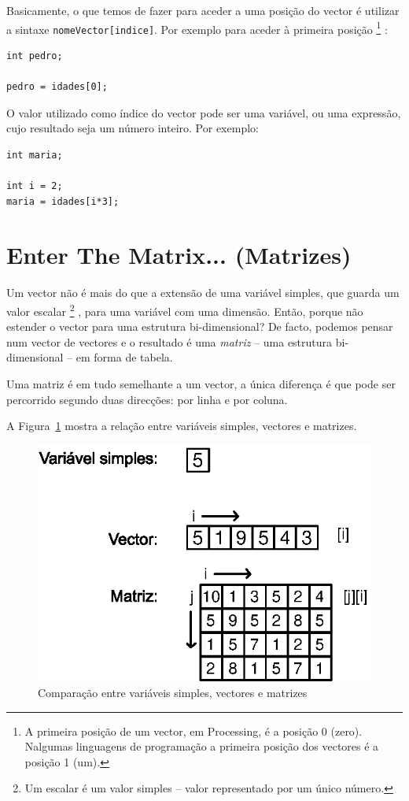 Basicamente, o que temos de fazer para aceder a uma posição do vector é utilizar a sintaxe \texttt{nomeVector[indice]}.
Por exemplo para aceder à primeira posição%
\footnote{A primeira posição de um vector, em Processing, é a posição 0 (zero). Nalgumas linguagens de programação a primeira posição dos vectores é a posição 1 (um).}%
:
\begin{lstlisting}
int pedro;

pedro = idades[0];
\end{lstlisting}

O valor utilizado como índice do vector pode ser uma variável, ou uma expressão, cujo resultado seja um número inteiro. Por exemplo:
\begin{lstlisting}
int maria;

int i = 2;
maria = idades[i*3];
\end{lstlisting}


\section{Enter The Matrix... (Matrizes)}
Um vector não é mais do que a extensão de uma variável simples, que guarda um valor escalar%
\footnote{Um escalar é um valor simples -- valor representado por um único número.}%
, para uma variável com uma dimensão. Então, porque não estender o vector para uma estrutura bi-dimensional?
De facto, podemos pensar num vector de vectores e o resultado é uma \emph{matriz} -- uma estrutura bi-dimensional -- em forma de tabela.

Uma matriz é em tudo semelhante a um vector, a única diferença é que pode ser percorrido segundo duas direcções: por linha e por coluna. 

A Figura~\ref{fig:variaveis} mostra a relação entre variáveis simples, vectores e matrizes.

\begin{figure}[htbp]
	\centering
		\includegraphics{images/variaveis.eps}
	\caption{Comparação entre variáveis simples, vectores e matrizes}
	\label{fig:variaveis}
\end{figure}

